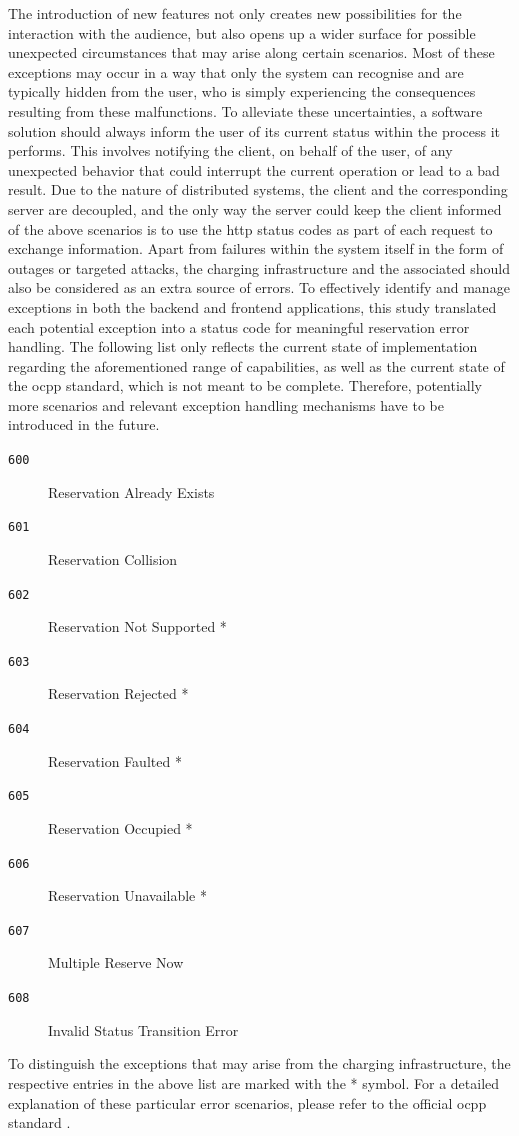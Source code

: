 The introduction of new features not only creates new possibilities for the interaction with the audience, but also opens up a wider surface for possible unexpected circumstances that may arise along certain scenarios. 
Most of these exceptions may occur in a way that only the system can recognise and are typically hidden from the user, who is simply experiencing the consequences resulting from these malfunctions.
To alleviate these uncertainties, a software solution should always inform the user of its current status within the process it performs. This involves notifying the client, on behalf of the user, of any unexpected behavior that could interrupt the current operation or lead to a bad result.
Due to the nature of distributed systems, the client and the corresponding server are decoupled, and the only way the server could keep the client informed of the above scenarios is to use the \acrshort{http} status codes as part of each request to exchange information.
Apart from failures within the system itself in the form of outages or targeted attacks, the charging infrastructure and the associated  should also be considered as an extra source of errors. 
To effectively identify and manage exceptions in both the backend and frontend applications, this study translated each potential exception into a status code for meaningful reservation error handling.
The following list only reflects the current state of implementation regarding the aforementioned range of capabilities, as well as the current state of the \acrshort{ocpp} standard, which is not meant to be complete. Therefore, potentially more scenarios and relevant exception handling mechanisms have to be introduced in the future.

\begin{multicols}{2}
\begin{description}
    \item[\texttt{600}] Reservation Already Exists
    \item[\texttt{601}] Reservation Collision
    \item[\texttt{602}] Reservation Not Supported *
    \item[\texttt{603}] Reservation Rejected *
    \item[\texttt{604}] Reservation Faulted *
\end{description}
\begin{description}
    \item[\texttt{605}] Reservation Occupied *
    \item[\texttt{606}] Reservation Unavailable *
    \item[\texttt{607}] Multiple Reserve Now
    \item[\texttt{608}] Invalid Status Transition Error
\end{description}
\end{multicols}

\noindent To distinguish the exceptions that may arise from the charging infrastructure, the respective entries in the above list are marked with the * symbol. For a detailed explanation of these particular error scenarios, please refer to the official \acrshort{ocpp} standard \cite{noauthor_ocpp_nodate}.
